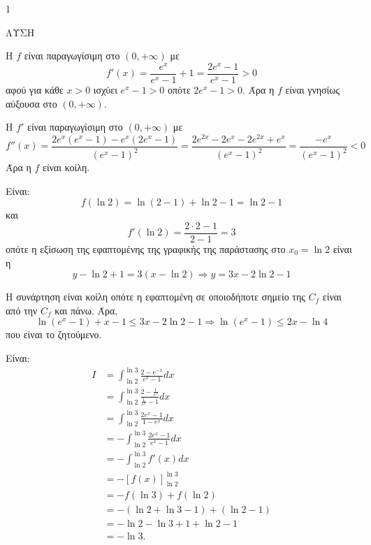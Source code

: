 \begin{ylh}{1}
    \item [Ύλη από εικόνα]
\end{ylh}
ΛΥΣΗ
\begin{alist}
    \item [α)]
        Η $f$ είναι παραγωγίσιμη στο $(0, +\infty)$ με
        \[ f'(x) = \frac{e^x}{e^x - 1} + 1 = \frac{2e^x - 1}{e^x - 1} > 0 \]
        αφού για κάθε $x > 0$ ισχύει $e^x - 1 > 0$ οπότε $2e^x - 1 > 0$.
        Άρα η $f$ είναι γνησίως αύξουσα στο $(0, +\infty)$.

        Η $f'$ είναι παραγωγίσιμη στο $(0, +\infty)$ με
        \[ f''(x) = \frac{2e^x(e^x - 1) - e^x(2e^x - 1)}{(e^x - 1)^2} = \frac{2e^{2x} - 2e^x - 2e^{2x} + e^x}{(e^x - 1)^2} = \frac{-e^x}{(e^x - 1)^2} < 0 \]
        Άρα η $f$ είναι κοίλη.
    \item [β)]
        \begin{rlist}
            \item [i.]
                Είναι:
                \[ f(\ln 2) = \ln(2 - 1) + \ln 2 - 1 = \ln 2 - 1 \]
                και
                \[ f'(\ln 2) = \frac{2 \cdot 2 - 1}{2 - 1} = 3 \]
                οπότε η εξίσωση της εφαπτομένης της γραφικής της παράστασης στο $x_0 = \ln 2$ είναι η
                \[ y - \ln 2 + 1 = 3(x - \ln 2) \Rightarrow y = 3x - 2\ln 2 - 1 \]
            \item [ii.]
                Η συνάρτηση είναι κοίλη οπότε η εφαπτομένη σε οποιοδήποτε σημείο της $C_f$ είναι από την $C_f$ και πάνω. Άρα,
                \[ \ln(e^x - 1) + x - 1 \leq 3x - 2\ln 2 - 1 \Rightarrow \ln(e^x - 1) \leq 2x - \ln 4 \]
                που είναι το ζητούμενο.
        \end{rlist}
    \item [γ)]
        Είναι:
        \begin{align*}
            I &= \int_{\ln 2}^{\ln 3} \frac{2 - e^{-x}}{e^x - 1} dx \\
            &= \int_{\ln 2}^{\ln 3} \frac{2 - \frac{1}{e^x}}{\frac{1}{e^x} - 1} dx \\
            &= \int_{\ln 2}^{\ln 3} \frac{2e^x - 1}{1 - e^x} dx \\
            &= - \int_{\ln 2}^{\ln 3} \frac{2e^x - 1}{e^x - 1} dx \\
            &= - \int_{\ln 2}^{\ln 3} f'(x) dx \\
            &= - [f(x)]_{\ln 2}^{\ln 3} \\
            &= -f(\ln 3) + f(\ln 2) \\
            &= -(\ln 2 + \ln 3 - 1) + (\ln 2 - 1) \\
            &= -\ln 2 - \ln 3 + 1 + \ln 2 - 1 \\
            &= -\ln 3.
        \end{align*}
\end{alist}
